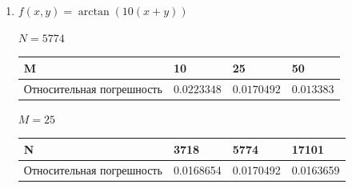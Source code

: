 \documentclass[14pt, a4paper]{extarticle}
\begin{document}
\begin{enumerate}
			\item \( f(x, y) = \arctan{(10(x + y))} \)
			
			\(N = 5774\)
			\begin{table}[H]
				\centering
				\begin{tabular}{|P{5cm}|P{2.5cm}|P{2.5cm}|P{2.5cm}|}
					\hline
					M & 10 & 25 & 50 \\ \hline
					Относительная погрешность & $0.0223348$ & $0.0170492$ & $0.013383$\\ \hline
				\end{tabular}
			\end{table}
			
			\(M = 25\)
			\begin{table}[H]
				\centering
				\begin{tabular}{|P{5cm}|P{2.5cm}|P{2.5cm}|P{2.5cm}|}
					\hline
					N & 3718 & 5774 & 17101 \\ \hline
					Относительная погрешность & 0.0168654 & 0.0170492 & 0.0163659\\ \hline
				\end{tabular}
			\end{table}
			

\end{enumerate}
\end{document}
